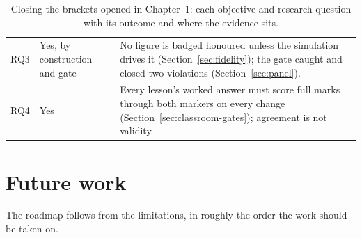 \documentclass[11pt,a4paper]{report}
\begin{document}
\begin{table}[h]
\begin{tabular}{@{}p{0.9cm}p{2.5cm}p{11.6cm}@{}}
RQ3 & Yes, by construction and gate & No figure is badged honoured unless the simulation drives it (Section~\ref{sec:fidelity}); the gate caught and closed two violations (Section~\ref{sec:panel}). \\
RQ4 & Yes & Every lesson's worked answer must score full marks through both markers on every change (Section~\ref{sec:classroom-gates}); agreement is not validity. \\
\bottomrule
\end{tabular}
\caption{Closing the brackets opened in Chapter~1: each objective and research question with its outcome and where the evidence sits.}
\label{fig:closure}
\end{table}

\section{Future work}
The roadmap follows from the limitations, in roughly the order the work should be taken on.
\end{document}
